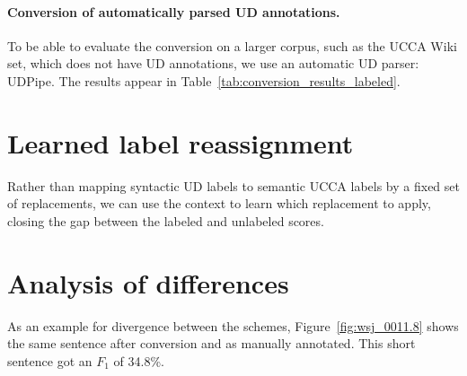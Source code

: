 \documentclass[11pt,a4paper]{article}
\begin{document}
\paragraph{Conversion of automatically parsed UD annotations.}

To be able to evaluate the conversion on a larger corpus,
such as the UCCA Wiki set, which does not have UD annotations,
we use an automatic UD parser: UDPipe.
The results appear in Table~\ref{tab:conversion_results_labeled}.


\section{Learned label reassignment}\label{sec:learning}

Rather than mapping syntactic UD labels to semantic UCCA labels
by a fixed set of replacements, we can use the context to learn
which replacement to apply, closing the gap between the labeled
and unlabeled scores.


\section{Analysis of differences}\label{sec:analysis}



As an example for divergence between the schemes, Figure~\ref{fig:wsj_0011.8} shows
the same sentence after conversion and as manually annotated.
This short sentence got an $F_1$ of 34.8\%.
\end{document}
